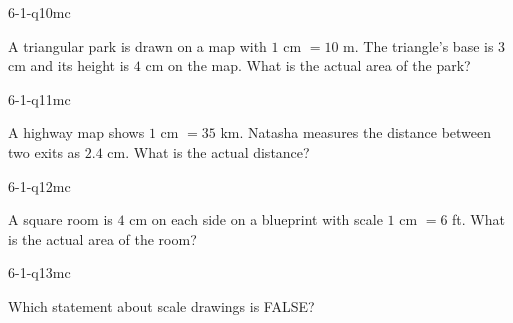 \begin{practiceQuestion}{6-1-q10}{mc}
\begin{questionText}
A triangular park is drawn on a map with $1$ cm $= 10$ m. The triangle's base is $3$ cm and its height is $4$ cm on the map. What is the actual area of the park?
\end{questionText}
\end{practiceQuestion}

\begin{practiceQuestion}{6-1-q11}{mc}
\begin{questionText}
A highway map shows $1$ cm $= 35$ km. Natasha measures the distance between two exits as $2.4$ cm. What is the actual distance?
\end{questionText}
\end{practiceQuestion}

\begin{practiceQuestion}{6-1-q12}{mc}
\begin{questionText}
A square room is $4$ cm on each side on a blueprint with scale $1$ cm $= 6$ ft. What is the actual area of the room?
\end{questionText}
\end{practiceQuestion}

\begin{practiceQuestion}{6-1-q13}{mc}
\begin{questionText}
Which statement about scale drawings is FALSE?
\end{questionText}
\end{practiceQuestion}

